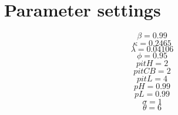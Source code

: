 \section{Parameter settings}

\begin{equation}
\beta = 0.99
\end{equation}
\begin{equation}
\kappa = 0.2465
\end{equation}
\begin{equation}
\lambda = 0.04106
\end{equation}
\begin{equation}
\phi = 0.95
\end{equation}
\begin{equation}
{p\!i\!t\!H} = 2
\end{equation}
\begin{equation}
{p\!i\!t\!C\!B} = 2
\end{equation}
\begin{equation}
{p\!i\!t\!L} = 4
\end{equation}
\begin{equation}
{p\!H} = 0.99
\end{equation}
\begin{equation}
{p\!L} = 0.99
\end{equation}
\begin{equation}
\sigma = 1
\end{equation}
\begin{equation}
\theta = 6
\end{equation}


